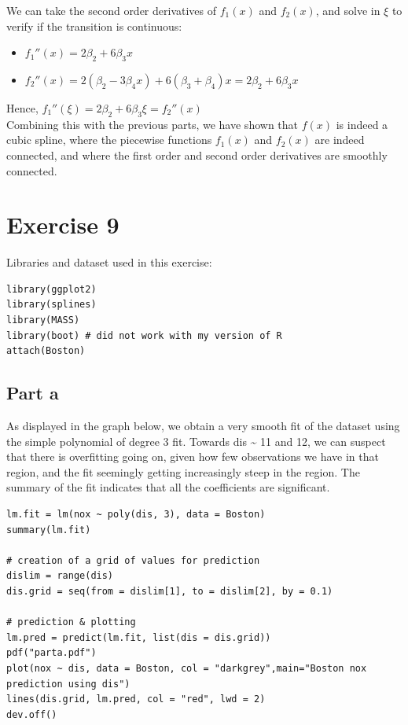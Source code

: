 \documentclass[11pt, a4paper]{article}
\begin{document}
We can take the second order derivatives of $f_1(x)$ and $f_2(x)$,
and solve in $\xi$ to verify if the transition is continuous:

\begin{itemize}
\item $f_1''(x) = 2\beta_2 + 6\beta_3 x$
\item $f_2''(x) = 2(\beta_2 - 3\beta_4 x) + 6(\beta_3 + \beta_4) x = 2\beta_2 + 6\beta_3 x$
\end{itemize}

Hence, $f_1''(\xi) = 2\beta_2 + 6\beta_3 \xi=f_2''(x)$ \\

Combining this with the previous parts, we have shown that $f(x)$ is
indeed a cubic spline, where the piecewise functions $f_1(x)$ and
$f_2(x)$ are indeed connected, and where the first order and second
order derivatives are smoothly connected.
\section{Exercise 9}
\label{sec-2}

Libraries and dataset used in this exercise:


\begin{verbatim}
library(ggplot2)
library(splines)
library(MASS)
library(boot) # did not work with my version of R
attach(Boston)
\end{verbatim}
\subsection{Part a}
\label{sec-2-1}


As displayed in the graph below, we obtain a very smooth fit of the
dataset using the simple polynomial of degree 3 fit. Towards dis \~{} 11
and 12, we can suspect that there is overfitting going on, given how
few observations we have in that region, and the fit seemingly getting
increasingly steep in the region. The summary of the fit indicates
that all the coefficients are significant.


\begin{verbatim}
lm.fit = lm(nox ~ poly(dis, 3), data = Boston)
summary(lm.fit)

# creation of a grid of values for prediction
dislim = range(dis)
dis.grid = seq(from = dislim[1], to = dislim[2], by = 0.1)

# prediction & plotting
lm.pred = predict(lm.fit, list(dis = dis.grid))
pdf("parta.pdf")
plot(nox ~ dis, data = Boston, col = "darkgrey",main="Boston nox prediction using dis") 
lines(dis.grid, lm.pred, col = "red", lwd = 2)
dev.off()
\end{verbatim}
\end{document}
